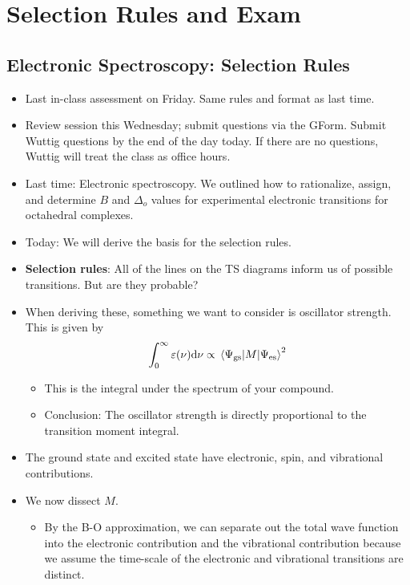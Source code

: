 \documentclass[../notes.tex]{subfiles}
\begin{document}
\chapter{Selection Rules and Exam}
\section{Electronic Spectroscopy: Selection Rules}
\begin{itemize}
    \item {}Last in-class assessment on Friday. Same rules and format as last time.
    \item Review session this Wednesday; submit questions via the GForm. Submit Wuttig questions by the end of the day today. If there are no questions, Wuttig will treat the class as office hours.
    \item Last time: Electronic spectroscopy. We outlined how to rationalize, assign, and determine $B$ and $\Delta_o$ values for experimental electronic transitions for octahedral complexes.
    \item Today: We will derive the basis for the selection rules.
    \item \textbf{Selection rules}: All of the lines on the TS diagrams inform us of possible transitions. But are they probable?
    \item When deriving these, something we want to consider is oscillator strength. This is given by
    \begin{equation*}
        \int_0^\infty\varepsilon(\nu)\dd\nu \propto \mel{\Psi_\text{gs}}{M}{\Psi_\text{es}}^2
    \end{equation*}
    \begin{itemize}
        \item This is the integral under the spectrum of your compound.
        \item Conclusion: The oscillator strength is directly proportional to the transition moment integral.
    \end{itemize}
    \item The ground state and excited state have electronic, spin, and vibrational contributions.
    \item We now dissect $M$.
    \begin{itemize}
        \item By the B-O approximation, we can separate out the total wave function into the electronic contribution and the vibrational contribution because we assume the time-scale of the electronic and vibrational transitions are distinct.

\end{itemize}
\end{itemize}
\end{document}

